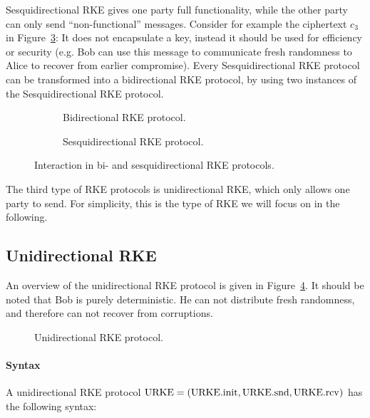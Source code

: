 Sesquidirectional RKE gives one party full functionality, while the other party can only send ``non-functional'' messages.
Consider for example the ciphertext $c_3$ in Figure~\ref{fig:RKE:sesq}:
It does not encapsulate a key, instead it should be used for efficiency or security (e.g. Bob can use this message to communicate fresh randomness to Alice to recover from earlier compromise).
Every Sesquidirectional RKE protocol can be transformed into a bidirectional RKE protocol, by using two instances of the Sesquidirectional RKE protocol.

\begin{figure}[!ht]
    \centering
    \begin{subfigure}{.5\textwidth}
        \centering
        
        \caption{Bidirectional RKE protocol.}
        \label{fig:RKE:bi}
    \end{subfigure}\hfill
    \begin{subfigure}{.5\textwidth}
        \centering
        
        \caption{Sesquidirectional RKE protocol.}
        \label{fig:RKE:sesq}
    \end{subfigure}
    \caption{Interaction in bi- and sesquidirectional RKE protocols.}
\end{figure}

The third type of RKE protocols is unidirectional RKE, which only allows one party to send.
For simplicity, this is the type of RKE we will focus on in the following.

\subsection{Unidirectional RKE}

An overview of the unidirectional RKE protocol is given in Figure~\ref{fig:rke:uni}.
It should be noted that Bob is purely deterministic.
He can not distribute fresh randomness, and therefore can not recover from corruptions.

\begin{figure}[!ht]
    \centering
    
    \caption{Unidirectional RKE protocol.}
    \label{fig:rke:uni}
\end{figure}

\paragraph{Syntax} A unidirectional RKE protocol $\mathrm{URKE}=(\mathrm{URKE}.\mathrm{init}, \mathrm{URKE}.\mathrm{snd}, \mathrm{URKE}.\mathrm{rcv})$ has the following syntax:

